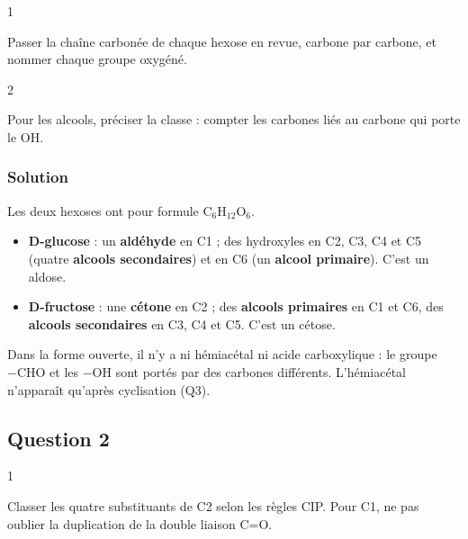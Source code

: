 \documentclass[11pt,a4paper]{article}
\providecommand{\tightlist}{\setlength{\itemsep}{0pt}\setlength{\parskip}{0pt}}
\begin{document}
\begin{indication}{1}

Passer la chaîne carbonée de chaque hexose en revue, carbone par carbone, et nommer chaque groupe oxygéné.

\end{indication}

\begin{indication}{2}

Pour les alcools, préciser la classe : compter les carbones liés au carbone qui porte le OH.

\end{indication}

\hypertarget{solution}{%
\subsubsection{Solution}\label{solution}}

Les deux hexoses ont pour formule \(\mathrm{C_6H_{12}O_6}\).

\begin{itemize}
\tightlist
\item
  \textbf{D-glucose} : un \textbf{aldéhyde} en C1 ; des hydroxyles en C2, C3, C4 et C5 (quatre \textbf{alcools secondaires}) et en C6 (un \textbf{alcool primaire}). C'est un aldose.
\item
  \textbf{D-fructose} : une \textbf{cétone} en C2 ; des \textbf{alcools primaires} en C1 et C6, des \textbf{alcools secondaires} en C3, C4 et C5. C'est un cétose.
\end{itemize}

\begin{piege}

Dans la forme ouverte, il n'y a ni hémiacétal ni acide carboxylique : le groupe \(-\mathrm{CHO}\) et les \(-\mathrm{OH}\) sont portés par des carbones différents. L'hémiacétal n'apparaît qu'après cyclisation (Q3).

\end{piege}

\hypertarget{question-2}{%
\subsection{Question 2}\label{question-2}}

\begin{indication}{1}

Classer les quatre substituants de C2 selon les règles CIP. Pour C1, ne pas oublier la duplication de la double liaison C=O.

\end{indication}
\end{document}
